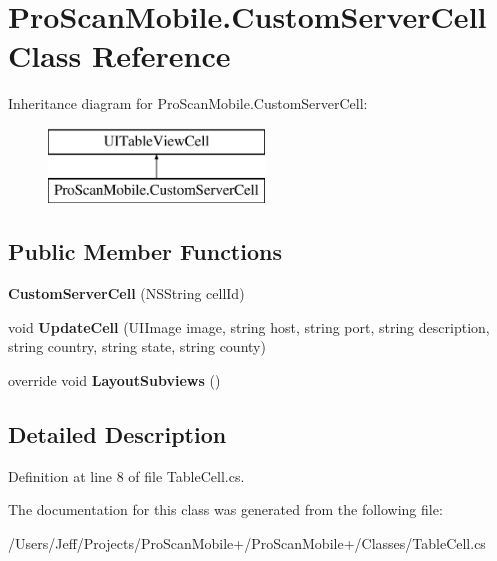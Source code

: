 \hypertarget{class_pro_scan_mobile_1_1_custom_server_cell}{\section{Pro\-Scan\-Mobile.\-Custom\-Server\-Cell Class Reference}
\label{class_pro_scan_mobile_1_1_custom_server_cell}
}
Inheritance diagram for Pro\-Scan\-Mobile.\-Custom\-Server\-Cell\-:\begin{figure}[H]
\begin{center}
\leavevmode
\includegraphics[height=2.000000cm]{class_pro_scan_mobile_1_1_custom_server_cell}
\end{center}
\end{figure}
\subsection*{Public Member Functions}
\begin{DoxyCompactItemize}
\item 
\hypertarget{class_pro_scan_mobile_1_1_custom_server_cell_ab16156002c5e173262fb48d26b3e0754}{{\bfseries Custom\-Server\-Cell} (N\-S\-String cell\-Id)}\label{class_pro_scan_mobile_1_1_custom_server_cell_ab16156002c5e173262fb48d26b3e0754}

\item 
\hypertarget{class_pro_scan_mobile_1_1_custom_server_cell_aa53cd659caf655d417602dddac91e28f}{void {\bfseries Update\-Cell} (U\-I\-Image image, string host, string port, string description, string country, string state, string county)}\label{class_pro_scan_mobile_1_1_custom_server_cell_aa53cd659caf655d417602dddac91e28f}

\item 
\hypertarget{class_pro_scan_mobile_1_1_custom_server_cell_a8dd06e9c800a56691ed2356d92e757c7}{override void {\bfseries Layout\-Subviews} ()}\label{class_pro_scan_mobile_1_1_custom_server_cell_a8dd06e9c800a56691ed2356d92e757c7}

\end{DoxyCompactItemize}


\subsection{Detailed Description}


Definition at line 8 of file Table\-Cell.\-cs.



The documentation for this class was generated from the following file\-:\begin{DoxyCompactItemize}
\item 
/\-Users/\-Jeff/\-Projects/\-Pro\-Scan\-Mobile+/\-Pro\-Scan\-Mobile+/\-Classes/Table\-Cell.\-cs\end{DoxyCompactItemize}
